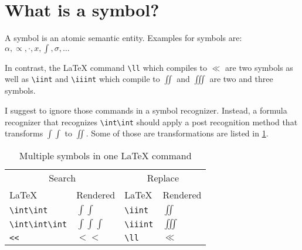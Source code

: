 \section{What is a symbol?}
A symbol is an atomic semantic entity. Examples for symbols are: $\alpha, \propto, \cdot, x, \int, \sigma, \dots$

In contrast, the \LaTeX{} command \verb+\ll+ which compiles to $\ll$ are two
symbols as well as \verb+\iint+ and \verb+\iiint+ which compile to $\iint$ and
$\iiint$ are two and three symbols. 

I suggest to ignore those commands in a symbol recognizer. Instead, a formula
recognizer that recognizes \verb+\int\int+ should apply a post recognition method
that transforms $\int\int$ to $\iint$. Some of those are transformations are
listed in \cref{table:postprocessing-formula-recognizer}.

\begin{table}[ht]
    \centering
    \begin{tabular}{ll|ll}
        \toprule
        \multicolumn{2}{c|}{Search}           & \multicolumn{2}{c}{Replace} \\
        \LaTeX{}            & Rendered       & \LaTeX{}      & Rendered \\\midrule
        \verb+\int\int+     & $\int\int$     & \verb+\iint+  & $\iint$ \\
        \verb+\int\int\int+ & $\int\int\int$ & \verb+\iiint+ & $\iiint$ \\
        \verb+<<+           & $<<$           & \verb+\ll+    & $\ll$ \\
        \bottomrule
    \end{tabular}
    \caption{Multiple symbols in one \LaTeX{} command}
    \label{table:postprocessing-formula-recognizer}
\end{table}